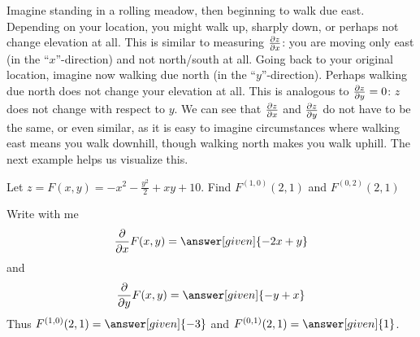 \documentclass{ximera}
\begin{document}
Imagine standing in a rolling meadow, then beginning to walk due
east. Depending on your location, you might walk up, sharply down, or
perhaps not change elevation at all. This is similar to measuring
$\pp[z]{x}$: you are moving only east (in the ``$x$''-direction) and
not north/south at all. Going back to your original location, imagine
now walking due north (in the ``$y$''-direction). Perhaps walking due
north does not change your elevation at all. This is analogous to
$\pp[z]{y}=0$: $z$ does not change with respect to $y$. We can see
that $\pp[z]{x}$ and $\pp[z]{y}$ do not have to be the same, or even
similar, as it is easy to imagine circumstances where walking east
means you walk downhill, though walking north makes you walk uphill.
The next example helps us visualize this.


\begin{example}
  Let $z=F(x,y)=-x^2-\frac{y^2}{2}+xy+10$. Find $F^{(1,0)}(2,1)$ and
  $F^{(0,2)}(2,1)$
  \begin{explanation}
    Write with me
    \[
    \pp{x}F(x,y) = \answer[given]{-2x+y}
    \]
    and
    \[
    \pp{y}F(x,y) = \answer[given]{-y+x}
    \]
    Thus $F^{(1,0)}(2,1) = \answer[given]{-3}$ and $F^{(0,1)}(2,1) =
    \answer[given]{1}$.
  \end{explanation}
\end{example}
\end{document}
